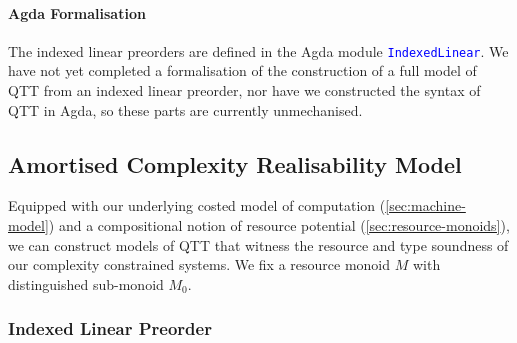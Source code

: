 \documentclass[acmsmall,review,screen,anonymous]{acmart}
\newcommand{\AgdaModule}[1]{\textcolor{blue}{\tt #1}}
\begin{document}
\paragraph{Agda Formalisation} The indexed linear preorders are
defined in the Agda module \AgdaModule{IndexedLinear}. We have not yet
completed a formalisation of the construction of a full model of QTT
from an indexed linear preorder, nor have we constructed the syntax of
QTT in Agda, so these parts are currently unmechanised.

\subsection{Amortised Complexity Realisability Model}
\label{sec:realisability-model}

Equipped with our underlying costed model of computation
(\autoref{sec:machine-model}) and a compositional notion of resource
potential (\autoref{sec:resource-monoids}), we can construct models of
QTT that witness the resource and type soundness of our complexity
constrained systems. We fix a resource monoid $M$ with distinguished
sub-monoid $M_0$.

\subsubsection{Indexed Linear Preorder}
\label{sec:realisability-indexed-linear-preorder}
\end{document}
